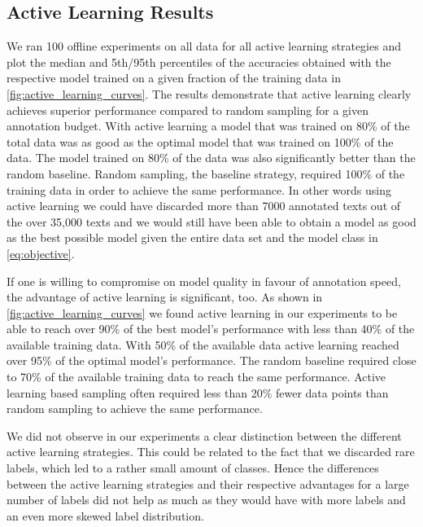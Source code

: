 \documentclass[runningheads,a4paper]{article}
\begin{document}
\subsection{Active Learning Results}
\label{sec:active_learning_results}
We ran 100 offline experiments on all data for all active learning strategies and plot the median and 5th/95th percentiles of the accuracies obtained with the respective model trained on a given fraction of the training data in \autoref{fig:active_learning_curves}. The results demonstrate that active learning clearly achieves superior performance compared to random sampling for a given annotation budget. With active learning a model that was trained on 80\% of the total data was as good as the optimal model that was trained on 100\% of the data. The model trained on 80\% of the data was also significantly better than the random baseline. Random sampling, the baseline strategy, required 100\% of the training data in order to achieve the same performance.
In other words using active learning we could have discarded more than 7000 annotated texts out of the over 35,000 texts and we would still have been able to obtain a model as good as the best possible model given the entire data set and the model class in \autoref{eq:objective}.

If one is willing to compromise on model quality in favour of annotation speed, the advantage of active learning is significant, too. As shown in \autoref{fig:active_learning_curves} we found active learning in our experiments to be able to reach over 90\% of the best model's performance with less than 40\% of the available training data. With 50\% of the available data active learning reached over 95\% of the optimal model's performance. The random baseline required close to 70\% of the available training data to reach the same performance. 
Active learning based sampling often required less than 20\% fewer data points than random sampling to achieve the same performance. 

We did not observe in our experiments a clear distinction between the different active learning strategies. This could be related to the fact that we discarded rare labels, which led to a rather small amount of classes. Hence the differences between the active learning strategies and their respective advantages for a large number of labels did not help as much as they would have with more labels and an even more skewed label distribution. 
\end{document}
